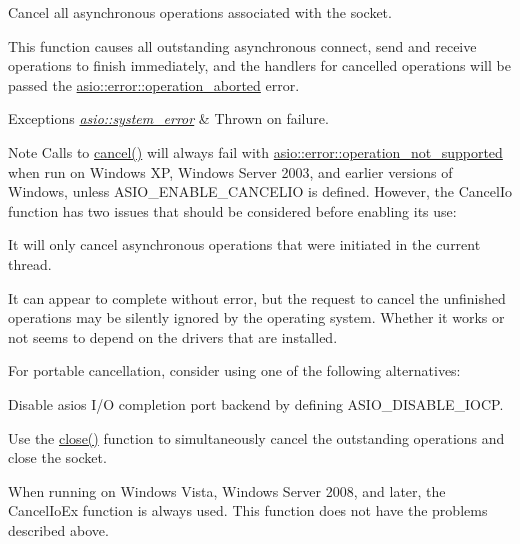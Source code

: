 Cancel all asynchronous operations associated with the socket. 

This function causes all outstanding asynchronous connect, send and receive operations to finish immediately, and the handlers for cancelled operations will be passed the \hyperlink{namespaceasio_1_1error_a2a69445eee784059ac2f4a6c4f5fe90dacde6760763051561f6c2ffc4ddf2be1b}{asio\+::error\+::operation\+\_\+aborted} error.


\begin{DoxyExceptions}{Exceptions}
{\em \hyperlink{classasio_1_1system__error}{asio\+::system\+\_\+error}} & Thrown on failure.\\
\hline
\end{DoxyExceptions}
\begin{DoxyNote}{Note}
Calls to \hyperlink{classasio_1_1basic__socket_a8c93c7f90a9c2b44e1bedfa8f2fe63c8}{cancel()} will always fail with \hyperlink{namespaceasio_1_1error_a2a69445eee784059ac2f4a6c4f5fe90daf5c69ee1029871764a105a18648aec91}{asio\+::error\+::operation\+\_\+not\+\_\+supported} when run on Windows X\+P, Windows Server 2003, and earlier versions of Windows, unless A\+S\+I\+O\+\_\+\+E\+N\+A\+B\+L\+E\+\_\+\+C\+A\+N\+C\+E\+L\+I\+O is defined. However, the Cancel\+Io function has two issues that should be considered before enabling its use\+:
\end{DoxyNote}
\begin{DoxyItemize}
\item It will only cancel asynchronous operations that were initiated in the current thread.\end{DoxyItemize}
\begin{DoxyItemize}
\item It can appear to complete without error, but the request to cancel the unfinished operations may be silently ignored by the operating system. Whether it works or not seems to depend on the drivers that are installed.\end{DoxyItemize}
For portable cancellation, consider using one of the following alternatives\+:

\begin{DoxyItemize}
\item Disable asio\textquotesingle{}s I/\+O completion port backend by defining A\+S\+I\+O\+\_\+\+D\+I\+S\+A\+B\+L\+E\+\_\+\+I\+O\+C\+P.\end{DoxyItemize}
\begin{DoxyItemize}
\item Use the \hyperlink{classasio_1_1basic__socket_aecb8346a5bc290e394a055b7d9164c0f}{close()} function to simultaneously cancel the outstanding operations and close the socket.\end{DoxyItemize}
When running on Windows Vista, Windows Server 2008, and later, the Cancel\+Io\+Ex function is always used. This function does not have the problems described above. 

